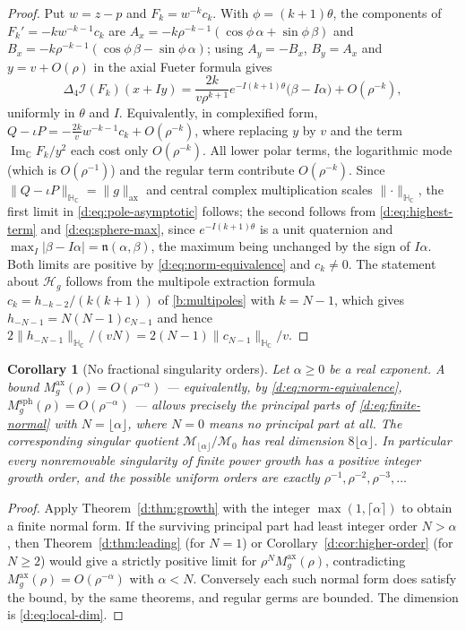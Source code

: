 \documentclass[11pt,a4paper]{article}
\numberwithin{equation}{section}
\newtheorem{corollary}[theorem]{Corollary}
\theoremstyle{definition}
\theoremstyle{remark}
\theoremstyle{plain}
\newcommand{\HC}{\mathbb H_{\mathbb C}}
\newcommand{\CC}{\mathbb C}
\DeclareMathOperator{\Ima}{Im}
\newcommand{\lap}{\Delta_4}
\newcommand{\I}{\mathcal I}
\newcommand{\Hg}{\mathcal H_{g}}      %
\newcommand{\nn}{\mathfrak n}         %
\newcommand{\axn}[1]{\lVert #1\rVert_{\mathrm{ax}}}   %
\newcommand{\Msph}{M^{\mathrm{sph}}}                  %
\newcommand{\Max}{M^{\mathrm{ax}}}                    %
\newcommand{\abs}[1]{\lvert #1\rvert}
\newcommand{\norm}[1]{\lVert #1\rVert}
\begin{document}
\begin{proof}
Put $w=z-p$ and $F_k=w^{-k}c_k$.  With $\phi=(k+1)\theta$, the components
of $F_k'=-kw^{-k-1}c_k$ are
$A_x=-k\rho^{-k-1}(\cos\phi\,\alpha+\sin\phi\,\beta)$ and
$B_x=-k\rho^{-k-1}(\cos\phi\,\beta-\sin\phi\,\alpha)$; using
$A_y=-B_x$, $B_y=A_x$ and $y=v+O(\rho)$ in the axial Fueter formula gives
\begin{equation}
 \lap\I(F_k)(x+Iy)
 =\frac{2k}{v\rho^{k+1}}e^{-I(k+1)\theta}\bigl(\beta-I\alpha\bigr)
 +O(\rho^{-k}),
 \label{d:eq:highest-term}
\end{equation}
uniformly in $\theta$ and $I$.  Equivalently, in complexified form,
$Q-\iota P=-\tfrac{2k}{v}w^{-k-1}c_k+O(\rho^{-k})$, where replacing $y$ by
$v$ and the term $\Ima_{\CC}F_k/y^2$ each cost only $O(\rho^{-k})$.  All
lower polar terms, the logarithmic mode (which is $O(\rho^{-1})$) and the
regular term contribute $O(\rho^{-k})$.  Since
$\norm{Q-\iota P}_{\HC}=\axn g$ and central complex multiplication scales
$\norm\cdot_{\HC}$, the first limit in \eqref{d:eq:pole-asymptotic}
follows; the second follows from \eqref{d:eq:highest-term} and
\eqref{d:eq:sphere-max}, since $e^{-I(k+1)\theta}$ is a unit quaternion and
$\max_I\abs{\beta-I\alpha}=\nn(\alpha,\beta)$, the maximum being unchanged
by the sign of $I\alpha$.  Both limits are positive by
\eqref{d:eq:norm-equivalence} and $c_k\ne0$.  The statement about $\Hg$
follows from the multipole extraction formula
$c_k=h_{-k-2}/(k(k+1))$ of \eqref{b:multipoles} with $k=N-1$, which gives
$h_{-N-1}=N(N-1)c_{N-1}$ and hence
$2\norm{h_{-N-1}}_{\HC}/(vN)=2(N-1)\norm{c_{N-1}}_{\HC}/v$.
\end{proof}

\begin{corollary}[No fractional singularity orders]
\label{d:cor:fractional}
Let $\alpha\ge0$ be a \emph{real} exponent.  A bound
$\Max_g(\rho)=O(\rho^{-\alpha})$ --- equivalently, by
\eqref{d:eq:norm-equivalence}, $\Msph_g(\rho)=O(\rho^{-\alpha})$ ---
allows precisely the principal parts of \eqref{d:eq:finite-normal} with
$N=\lfloor\alpha\rfloor$, where $N=0$ means no principal part at all.  The
corresponding singular quotient
$\mathcal M_{\lfloor\alpha\rfloor}/\mathcal M_0$ has real dimension
$8\lfloor\alpha\rfloor$.  In particular every nonremovable singularity of
finite power growth has a positive \emph{integer} growth order, and the
possible uniform orders are exactly $\rho^{-1},\rho^{-2},\rho^{-3},\dots$
\end{corollary}

\begin{proof}
Apply Theorem~\ref{d:thm:growth} with the integer
$\max(1,\lceil\alpha\rceil)$ to obtain a finite normal form.  If the
surviving principal part had least integer order $N>\alpha$, then
Theorem~\ref{d:thm:leading} (for $N=1$) or
Corollary~\ref{d:cor:higher-order} (for $N\ge2$) would give a strictly
positive limit for $\rho^{N}\Max_g(\rho)$, contradicting
$\Max_g(\rho)=O(\rho^{-\alpha})$ with $\alpha<N$.  Conversely each such
normal form does satisfy the bound, by the same theorems, and regular germs
are bounded.  The dimension is \eqref{d:eq:local-dim}.
\end{proof}
\end{document}
